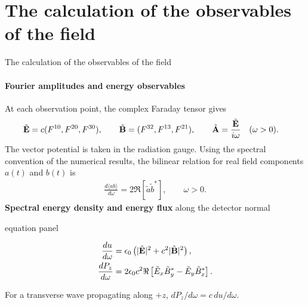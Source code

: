 \documentclass[aspectratio=169, 10pt]{beamer}
\newcommand{\theorylabel}[1]{{\color{ValidationTeal}\textbf{#1}}}
\newenvironment{equationpanel}{%
  \par
  \begin{beamercolorbox}[wd=\linewidth,sep=0pt]{equation panel}%
  }{%
  \end{beamercolorbox}%
}
\begin{document}
\section{The calculation of the observables of the field}
\begin{frame}{The calculation of the observables of the field}
  \framesubtitle{Fourier amplitudes and energy observables}
  \setlength{\abovedisplayskip}{3pt}
  \setlength{\belowdisplayskip}{3pt}
  At each observation point, the complex Faraday tensor gives
  \begin{align*}
    \tilde{\bf E}&=c(F^{10},F^{20},F^{30}),\qquad
    \tilde{\bf B}=(F^{32},F^{13},F^{21}),\qquad
    \tilde{\bf A}=\frac{\tilde{\bf E}}{i\omega}\quad(\omega>0).
  \end{align*}
  The vector potential is taken in the radiation gauge. Using the spectral convention
  of the numerical results, the bilinear relation for real field components $a(t)$ and $b(t)$ is
  \begin{align*}
    \frac{d\langle ab\rangle}{d\omega}=2\Re[\tilde a\tilde b^*],\qquad \omega>0.
  \end{align*}
  \theorylabel{Spectral energy density and energy flux} along the detector normal
  \begin{equationpanel}
    \begin{align*}
      \frac{d u}{d\omega}
      &=\epsilon_0\left(|\tilde{\bf E}|^2+c^2|\tilde{\bf B}|^2\right),\\
      \frac{d P_z}{d\omega}
      &=2\epsilon_0c^2\Re\left[\tilde E_x\tilde B_y^*-\tilde E_y\tilde B_x^*\right].
    \end{align*}
  \end{equationpanel}
  For a transverse wave propagating along $+z$, $d P_z/d\omega=c\,d u/d\omega$.
\end{frame}
\end{document}
